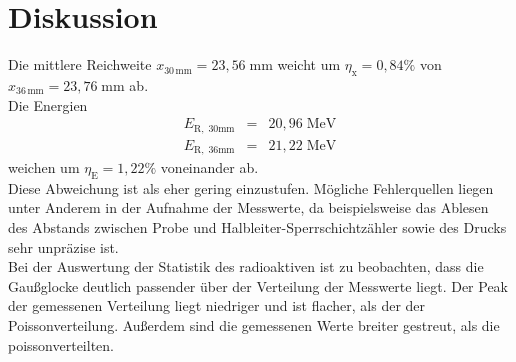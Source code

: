 \section{Diskussion}
\label{sec:Diskussion}


Die mittlere Reichweite $x_{\mathrm{30 \, mm}} = 23,56  \; \mathrm{mm}$ weicht um 
$\eta_{\mathrm{x}} = 0,84 \%$ von $x_{\mathrm{36 \, mm}} = 23,76  \; \mathrm{mm}$ ab.\\

Die Energien
\begin{eqnarray}
    E_{\mathrm{R, \; 30mm}} &=& 20,96 \; \mathrm{MeV}  \nonumber \\
    E_{\mathrm{R, \; 36mm}} &=& 21,22 \; \mathrm{MeV}  \nonumber
\end{eqnarray}
weichen um $\eta_{\mathrm{E}} = 1,22 \%$ voneinander ab.\\
Diese Abweichung ist als eher gering einzustufen.
Mögliche Fehlerquellen liegen unter Anderem in der Aufnahme der Messwerte, 
da beispielsweise das Ablesen des Abstands zwischen Probe und Halbleiter-Sperrschichtzähler sowie des Drucks sehr unpräzise ist.\\
Bei der Auswertung der Statistik des radioaktiven ist zu beobachten, dass die 
Gaußglocke deutlich passender über der Verteilung der Messwerte liegt. 
Der Peak der gemessenen Verteilung liegt niedriger und ist flacher, als der der Poissonverteilung.
Außerdem sind die gemessenen Werte breiter gestreut, als die poissonverteilten.\\